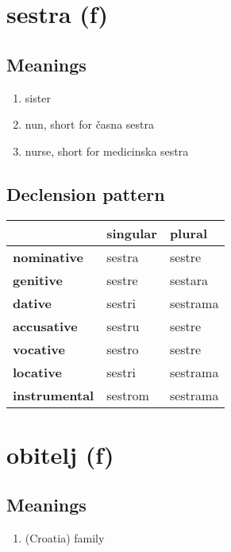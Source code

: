 \filbreak
\section{sestra (f)}
\subsection*{Meanings}
\begin{enumerate}
\item sister
\item nun, short for časna sestra
\item nurse, short for medicinska sestra
\end{enumerate}
\subsection*{Declension pattern}
\begin{tabularx}{\linewidth}{Xll}
\toprule
{} & singular &    plural \\
\midrule
\textbf{nominative  } &   sestra &    sestre \\
\textbf{genitive    } &   sestre &   sestara \\
\textbf{dative      } &   sestri &  sestrama \\
\textbf{accusative  } &   sestru &    sestre \\
\textbf{vocative    } &   sestro &    sestre \\
\textbf{locative    } &   sestri &  sestrama \\
\textbf{instrumental} &  sestrom &  sestrama \\
\bottomrule
\end{tabularx}

\filbreak
\section{obitelj (f)}
\subsection*{Meanings}
\begin{enumerate}
\item (Croatia) family
\end{enumerate}
